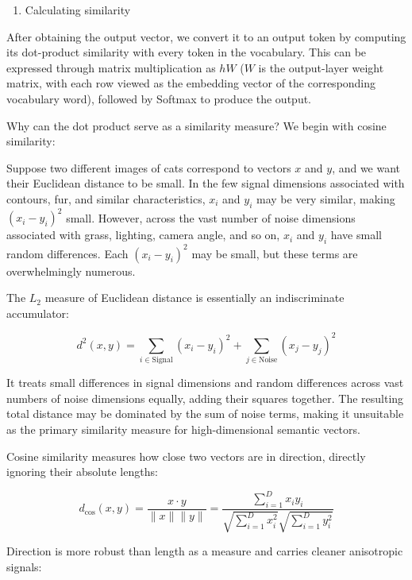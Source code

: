 \begin{enumerate}
\def\labelenumi{\arabic{enumi}.}
\setcounter{enumi}{1}
\tightlist
\item
  Calculating similarity
\end{enumerate}

After obtaining the output vector, we convert it to an output token by computing its dot-product similarity with every token in the vocabulary. This can be expressed through matrix multiplication as \(hW\) (\(W\) is the output-layer weight matrix, with each row viewed as the embedding vector of the corresponding vocabulary word), followed by Softmax to produce the output.

Why can the dot product serve as a similarity measure? We begin with cosine similarity:

Suppose two different images of cats correspond to vectors \(x\) and \(y\), and we want their Euclidean distance to be small. In the few signal dimensions associated with contours, fur, and similar characteristics, \(x_i\) and \(y_i\) may be very similar, making \((x_i-y_i)^2\) small. However, across the vast number of noise dimensions associated with grass, lighting, camera angle, and so on, \(x_i\) and \(y_i\) have small random differences. Each \((x_i-y_i)^2\) may be small, but these terms are overwhelmingly numerous.

The \(L_2\) measure of Euclidean distance is essentially an indiscriminate accumulator:

\[
d^2(x,y)=\sum_{i\in\text{Signal}}(x_i-y_i)^2+\sum_{j\in\text{Noise}}(x_j-y_j)^2
\]

It treats small differences in signal dimensions and random differences across vast numbers of noise dimensions equally, adding their squares together. The resulting total distance may be dominated by the sum of noise terms, making it unsuitable as the primary similarity measure for high-dimensional semantic vectors.

Cosine similarity measures how close two vectors are in direction, directly ignoring their absolute lengths:

\[
d_{\cos}(x,y)=\frac{x\cdot y}{\|x\|\|y\|}=\frac{\sum_{i=1}^{D}x_i y_i}{\sqrt{\sum_{i=1}^{D}x_i^2}\sqrt{\sum_{i=1}^{D}y_i^2}}
\]

Direction is more robust than length as a measure and carries cleaner anisotropic signals:

